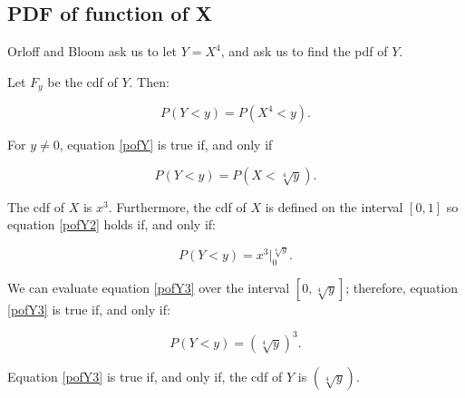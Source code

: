 \documentclass[a4paper,11pt]{article}
\begin{document}
\subsection{PDF of function of X}
Orloff and Bloom ask us to let $Y=X^4$, and ask us to find the pdf of $Y$.

Let $F_y$ be the cdf of $Y$. Then:

\begin{equation} \label{pofY}
  P\left(Y < y \right) = P \left( X^4 < y \right).
\end{equation}

For $y \neq 0$, equation \ref{pofY} is true if, and only if

\begin{equation} \label{pofY2}
  P\left(Y < y \right) = P \left( X < \sqrt[4]{y} \right).
\end{equation}

The cdf of $X$ is $x^3$. Furthermore, the cdf of $X$ is defined on
the interval $\left[0, 1 \right]$ so equation \ref{pofY2} holds if,
and only if:

\begin{equation}\label{pofY3}
  P\left(Y < y \right) = x^3 \bigg\rvert_0^{\sqrt[4]{y}}.
\end{equation}

We can evaluate equation \ref{pofY3} over the interval
$\left[ 0, \sqrt[4]{y} \right]$; therefore, equation \ref{pofY3} is
true if, and only if:


\begin{equation}\label{pofY3}
  P\left(Y < y \right) = \left( \sqrt[4]{y}\right)^3 .
\end{equation}

Equation \ref{pofY3} is true if, and only if, the cdf of $Y$ is
$\left( \sqrt[4]{y} \right)$.

\printbibliography{}
\end{document}
